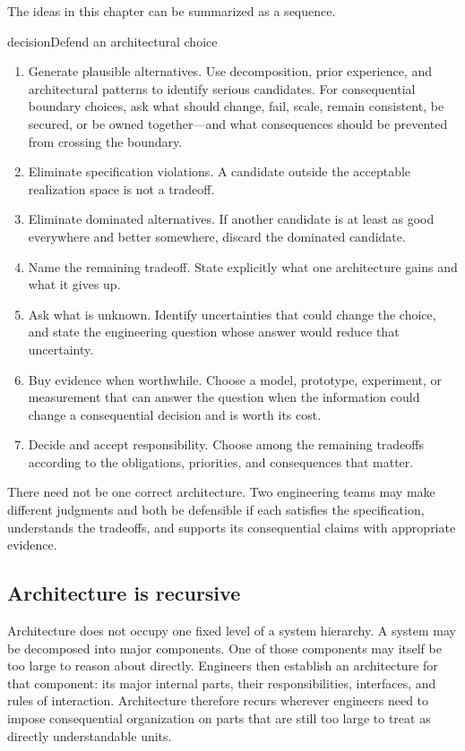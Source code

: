 The ideas in this chapter can be summarized as a sequence.

\begin{bookbox}{decision}{Defend an architectural choice} %
\begin{enumerate}
\def\labelenumi{\arabic{enumi}.}
\tightlist
\item
  Generate plausible alternatives. Use decomposition, prior experience, and architectural patterns
  to identify serious candidates. For consequential boundary choices, ask what should change,
  fail, scale, remain consistent, be secured, or be owned together---and what consequences should be
  prevented from crossing the boundary.
\item
  Eliminate specification violations. A candidate outside the acceptable realization space is not
  a tradeoff.
\item
  Eliminate dominated alternatives. If another candidate is at least as good everywhere and better
  somewhere, discard the dominated candidate.
\item
  Name the remaining tradeoff. State explicitly what one architecture gains and what it gives up.
\item
  Ask what is unknown. Identify uncertainties that could change the choice, and state the
  engineering question whose answer would reduce that uncertainty.
\item
  Buy evidence when worthwhile. Choose a model, prototype, experiment, or measurement that can
  answer the question when the information could change a consequential decision and is worth
  its cost.
\item
  Decide and accept responsibility. Choose among the remaining tradeoffs according to the
  obligations, priorities, and consequences that matter.
\end{enumerate}
\end{bookbox}

There need not be one correct architecture. Two engineering teams may make different judgments and
both be defensible if each satisfies the specification, understands the tradeoffs, and supports
its consequential claims with appropriate evidence.

\subsection{Architecture is recursive}\label{sec-recursive}

Architecture does not occupy one fixed level of a system hierarchy. A system may be decomposed into
major components. One of those components may itself be too large to reason about directly.
Engineers then establish an architecture for that component: its major internal parts, their
responsibilities, interfaces, and rules of interaction. Architecture therefore recurs wherever
engineers need to impose consequential organization on parts that are still too large to treat as
directly understandable units.

